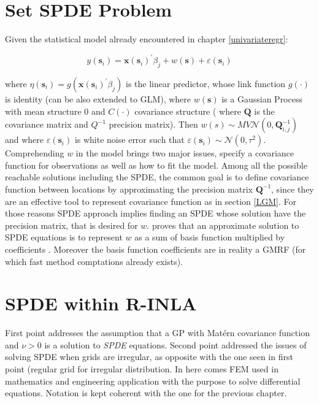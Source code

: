 \documentclass[
  12pt,
  a4paper,
  oneside]{book}
\theoremstyle{definition}
\theoremstyle{definition}
\theoremstyle{definition}
\theoremstyle{remark}
\begin{document}
\hypertarget{set-spde-problem}{%
\section{Set SPDE Problem}\label{set-spde-problem}}

Given the statistical model already encountered in chapter \ref{univariateregr}:

\[
y\left(\mathbf{s}_{i}\right)=\mathbf{x}\left(\mathbf{s}_{i}\right)^{\prime} \beta_{j}+w(\mathbf{s})+\varepsilon\left(\mathbf{s}_{i}\right)
\]

where \(\eta(\mathbf{s}_{i}) = g (\mathbf{x}\left(\mathbf{s}_{i}\right)^{\prime}\beta_{j})\) is the linear predictor, whose link function \(g( \cdot )\) is identity (can be also extended to GLM), where \(w(\mathbf{s})\) is a Gaussian Process with mean structure 0 and \(C(\cdot)\) covariance structure ( where \(\boldsymbol{Q}\) is the covariance matrix and \(Q^{-1}\) precision matrix). Then \(w(s) \sim MV\mathcal{N}(0, \boldsymbol{Q}_{i,j}^{-1})\) and where \(\varepsilon(\mathbf{s}_{i})\) is white noise error such that \(\varepsilon(\mathbf{s}_{i}) \sim \mathcal{N}\left(0, \tau^{2}\right)\).
Comprehending \(w\) in the model brings two major issues, specify a covariance function for observations as well as how to fit the model. Among all the possible reachable solutions including the SPDE, the common goal is to define covariance function between locations by approximating the precision matrix \(\boldsymbol{Q}^{-1}\), since they are an effective tool to represent covariance function as in section \ref{LGM}.
For those reasons SPDE approach implies finding an SPDE whose solution have the precision matrix, that is desired for \(w\). \citet{Lindgren2011} proves that an approximate solution to SPDE equations is to represent \(w\) as a sum of basis function multiplied by coefficients \citeyearpar{Miller2019}. Moreover the basis function coefficients are in reality a GMRF (for which fast method comptations already exists).

\hypertarget{spde-within-r-inla}{%
\section{SPDE within R-INLA}\label{spde-within-r-inla}}

First point addresses the assumption that a GP with Matérn covariance function and \(\nu >0\) is a solution to \emph{SPDE} equations.
Second point addressed the issues of solving SPDE when grids are irregular, as opposite with the one seen in first point (regular grid for irregular distribution. In here comes FEM used in mathematics and engineering application with the purpose to solve differential equations. Notation is kept coherent with the one for the previous chapter.
\end{document}

